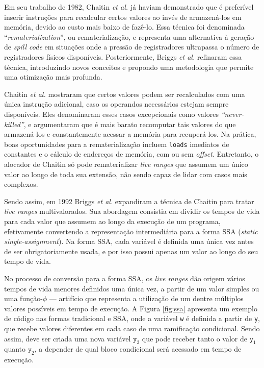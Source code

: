 \documentclass[
	12pt,				%
	openright,			%
	oneside,			%
	a4paper,			%
	tccpreliminar,			%
	]{ABNT-DC-UEL}
\begin{document}
Em seu trabalho de 1982, Chaitin \textit{et al.} \cite{chaitin:82} já haviam demonstrado que é preferível inserir instruções para recalcular certos valores ao invés de armazená-los em memória, devido ao custo mais baixo de fazê-lo. Essa técnica foi denominada ``\textit{rematerialization}'', ou rematerialização, e representa uma alternativa à geração de \textit{spill code} em situações onde a pressão de registradores ultrapassa o número de registradores físicos disponíveis. Posteriormente, Briggs \textit{et al.} \cite{briggs2:92} refinaram essa técnica, introduzindo novos conceitos e propondo uma metodologia que permite uma otimização mais profunda.

Chaitin \textit{et al.} mostraram que certos valores podem ser recalculados com uma única instrução adicional, caso os operandos necessários estejam sempre disponíveis. Eles denominaram esses casos excepcionais como valores \textit{``never-killed''}, e argumentaram que é mais barato recomputar tais valores do que armazená-los e constantemente acessar a memória para recuperá-los. Na prática, boas oportunidades para a rematerialização incluem \texttt{loads} imediatos de constantes e o cálculo de endereços de memória, com ou sem \textit{offset}. Entretanto, o alocador de Chaitin só pode rematerializar \textit{live ranges} que assumem um único valor ao longo de toda sua extensão, não sendo capaz de lidar com casos mais complexos.

Sendo assim, em 1992 Briggs \textit{et al.} \cite{briggs2:92} expandiram a técnica de Chaitin para tratar \textit{live ranges} multivalorados. Sua abordagem consistia em dividir os tempos de vida para cada valor que assumem ao longo da execução de um programa, efetivamente convertendo a representação intermediária para a forma SSA (\textit{static single-assignment}). Na forma SSA, cada variável é definida uma única vez antes de ser obrigatoriamente usada, e por isso possui apenas um valor ao longo do seu tempo de vida. 

No processo de conversão para a forma SSA, os \textit{live ranges} dão origem vários tempos de vida menores definidos uma única vez, a partir de um valor simples ou uma função-$\phi$ --- artifício que representa a utilização de um dentre múltiplos valores possíveis em tempo de execução. A Figura \ref{fig:ssa} apresenta um exemplo de código nas formas tradicional e SSA, onde a variável \texttt{w} é definida a partir de \texttt{y}, que recebe valores diferentes em cada caso de uma ramificação condicional. Sendo assim, deve ser criada uma nova variável $\texttt{y}_3$ que pode receber tanto o valor de $\texttt{y}_1$ quanto $\texttt{y}_2$, a depender de qual bloco condicional será acessado em tempo de execução.
\end{document}
